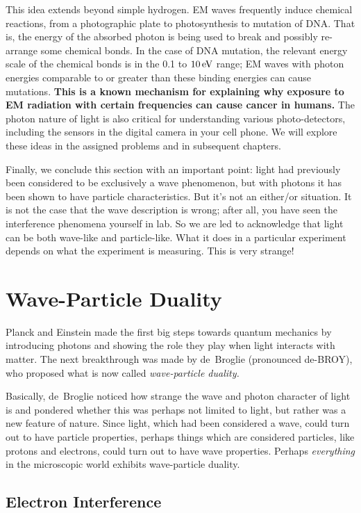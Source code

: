 This idea extends beyond simple hydrogen.  EM waves frequently induce
chemical reactions, from a photographic plate to photosynthesis to
mutation of DNA.  That is, the energy of the absorbed photon is being
used to break and possibly re-arrange some chemical bonds. In the case of DNA mutation, the
relevant energy scale of the chemical bonds is in the 0.1 to $10\,\mbox{eV}$
range; EM waves with photon energies comparable to or greater than 
these binding energies can cause mutations. {\bf This is a known mechanism
for explaining why exposure to EM radiation with certain frequencies can
cause cancer in humans.} The photon nature of light is also critical
for understanding various photo-detectors, including the sensors
in the digital camera in your cell phone. We will explore these ideas in the
assigned problems and in subsequent chapters.

Finally, we conclude this section with an important point: light had
previously been considered to be exclusively a wave phenomenon, but
with photons it has been shown to have particle characteristics.  But
it's not an either/or situation.  It is not the case that the wave
description is wrong; after all, you have seen the interference
phenomena yourself in lab.  So we are led to acknowledge that light
can be both wave-like and particle-like.  What it does in a particular
experiment depends on what the experiment is measuring.  This is very
strange! 

\section{Wave-Particle Duality}
\label{sec:wave_particle_duality}

Planck and Einstein made the first big steps towards quantum mechanics
by introducing photons and showing the role they play when light
interacts with matter.  The next breakthrough was made by de~Broglie
(pronounced de-BROY), who proposed what is now called {\it
  wave-particle duality.}

Basically, de~Broglie noticed how strange the wave and photon
character of light is and pondered whether this was perhaps not
limited to light, but rather was a new feature of nature.  Since
light, which had been considered a wave, could turn out to have
particle properties, perhaps things which are considered particles,
like protons and electrons, could turn out to have wave properties.
Perhaps {\it everything} in the microscopic world exhibits
wave-particle duality.

\subsection{Electron Interference}

